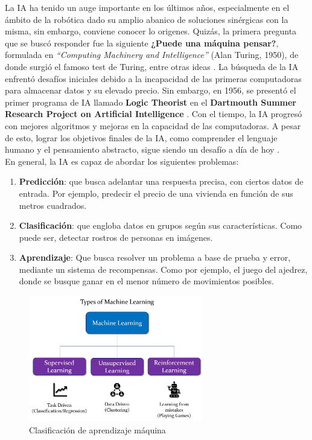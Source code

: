 La \ac{IA} ha tenido un auge importante en los últimos años, especialmente en el ámbito de la robótica dado su amplio abanico de soluciones sinérgicas con la misma, sin embargo, conviene conocer lo origenes. Quizás, la primera pregunta que se buscó responder fue la siguiente \textbf{¿Puede una máquina pensar?}, formulada en \emph{``Computing Machinery and Intelligence''} (Alan Turing, 1950), de donde surgió el famoso test de Turing, entre otras ideas \cite{turing-paper}. La búsqueda de la \ac{IA} enfrentó desafíos iniciales debido a la incapacidad de las primeras computadoras para almacenar datos y su elevado precio. Sin embargo, en 1956, se presentó el primer programa de \ac{IA} llamado \textbf{Logic Theorist} en el \textbf{Dartmouth Summer Research Project on Artificial Intelligence} \cite{logic-theorist}. Con el tiempo, la IA progresó con mejores algoritmos y mejoras en la capacidad de las computadoras. A pesar de esto, lograr los objetivos finales de la IA, como comprender el lenguaje humano y el pensamiento abstracto, sigue siendo un desafío a día de hoy \cite{history-ai}.\\

En general, la \ac{IA} es capaz de abordar los siguientes problemas:

\begin{enumerate}
	\item \textbf{Predicción}: que busca adelantar una respuesta precisa, con ciertos datos de entrada. Por ejemplo, predecir el precio de una vivienda en función de sus metros cuadrados.

	\item \textbf{Clasificación}: que engloba datos en grupos según sus características. Como puede ser, detectar rostros de personas en imágenes.
	
    \item \textbf{Aprendizaje}: Que busca resolver un problema a base de prueba y error, mediante un sistema de recompensas. Como por ejemplo, el juego del ajedrez, donde se busque ganar en el menor número de movimientos posibles.
\end{enumerate} \cite{reg-class}

\begin{figure} [H]
	\begin{center}
	\includegraphics[height=5.5cm]{imagenes/cap1/8_AI_types.png}
	\end{center}
	\caption[Clasificación de aprendizaje máquina]{Clasificación de aprendizaje máquina}
	\label{fig:ai_types}
\end{figure}

